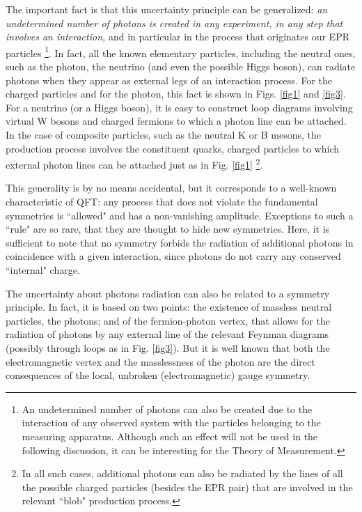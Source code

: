 \documentclass[aps,prl,showkeys,showpacs,preprint,groupedaddress,12pt]{revtex4}
\begin{document}
The important fact is that this uncertainty principle can be
generalized: {\it an undetermined number of photons is created in
any experiment, in any step that involves an interaction,} and in
particular in the process that originates our EPR particles
\footnote{An undetermined number of photons can also be created
due to the interaction of any observed system with the particles
belonging to the measuring apparatus. Although such an effect will
not be used in the following discussion, it can be interesting for
the Theory of Measurement.}. In fact, all the known elementary
particles, including the neutral ones, such as the photon, the
neutrino (and even the possible Higgs boson), can radiate photons
when they appear as external legs of an interaction process. For
the charged particles and for the photon, this fact is shown in
Figs. \ref{fig1} and \ref{fig3}. For a neutrino (or a Higgs
boson), it is easy to construct loop diagrams involving virtual W
bosons and charged fermions to which a photon line can be
attached. In the case of composite particles, such as the neutral
K or B mesons, the production process involves the constituent
quarks, charged particles to which external photon lines can be
attached just as in Fig. \ref{fig1} \footnote{In all such cases,
additional photons can also be radiated by the lines of all the
possible charged particles (besides the EPR pair) that are
involved in the relevant ``blob" production process.}.

This generality is by no means accidental, but it corresponds to a
well-known characteristic of QFT: any process that does not
violate the fundamental symmetries is ``allowed" and has a
non-vanishing amplitude. Exceptions to such a ``rule" are so rare,
that they are thought to hide new symmetries. Here, it is
sufficient to note that no symmetry forbids the radiation of
additional photons in coincidence with a given interaction, since
photons do not carry any conserved ``internal" charge.

The uncertainty about photons radiation can also be related to a
symmetry principle. In fact, it is based on two points: the
existence of massless neutral particles, the photons; and of the
fermion-photon vertex, that allows for the radiation of photons by
any external line of the relevant Feynman diagrams (possibly
through loops as in Fig. \ref{fig3}). But it is well known that
both the electromagnetic vertex and the masslessness of the photon
are the direct consequences of the local, unbroken
(electromagnetic) gauge symmetry.
\end{document}
